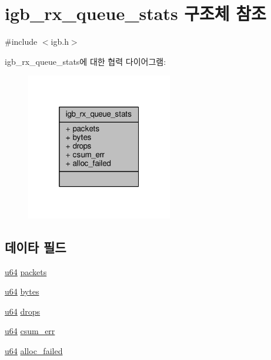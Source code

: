 \hypertarget{structigb__rx__queue__stats}{}\section{igb\+\_\+rx\+\_\+queue\+\_\+stats 구조체 참조}
\label{structigb__rx__queue__stats}


{\ttfamily \#include $<$igb.\+h$>$}



igb\+\_\+rx\+\_\+queue\+\_\+stats에 대한 협력 다이어그램\+:
\nopagebreak
\begin{figure}[H]
\begin{center}
\leavevmode
\includegraphics[width=181pt]{structigb__rx__queue__stats__coll__graph}
\end{center}
\end{figure}
\subsection*{데이타 필드}
\begin{DoxyCompactItemize}
\item 
\hyperlink{lib_2igb_2e1000__osdep_8h_a1d8f78f95a414480659f3182e6067b80}{u64} \hyperlink{structigb__rx__queue__stats_ae5fef1d76642baa9a22fafc8c04907c5}{packets}
\item 
\hyperlink{lib_2igb_2e1000__osdep_8h_a1d8f78f95a414480659f3182e6067b80}{u64} \hyperlink{structigb__rx__queue__stats_a1b0587fe9418ec065eee9e7593528b12}{bytes}
\item 
\hyperlink{lib_2igb_2e1000__osdep_8h_a1d8f78f95a414480659f3182e6067b80}{u64} \hyperlink{structigb__rx__queue__stats_a0e7ed04a01d0914efb49e588a8c49ea8}{drops}
\item 
\hyperlink{lib_2igb_2e1000__osdep_8h_a1d8f78f95a414480659f3182e6067b80}{u64} \hyperlink{structigb__rx__queue__stats_a62812d439bcb04e61a26b8e80895b0a6}{csum\+\_\+err}
\item 
\hyperlink{lib_2igb_2e1000__osdep_8h_a1d8f78f95a414480659f3182e6067b80}{u64} \hyperlink{structigb__rx__queue__stats_a260763fb6a6e3c1a33dc38d7e46bd610}{alloc\+\_\+failed}
\end{DoxyCompactItemize}


